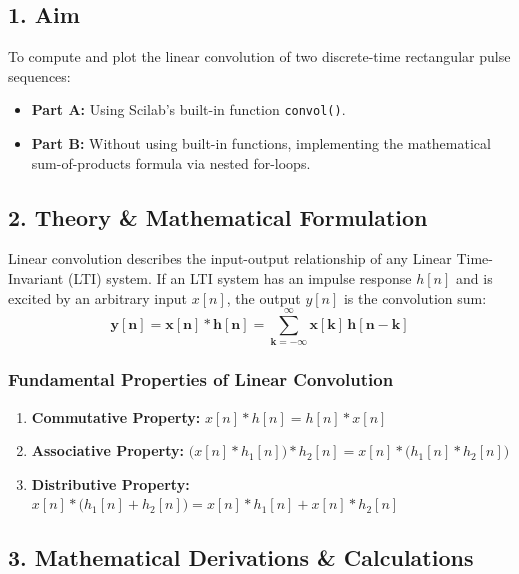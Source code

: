 \documentclass[11pt,a4paper]{article}
\begin{document}
\subsection*{1. Aim}
To compute and plot the linear convolution of two discrete-time rectangular pulse sequences:
\begin{itemize}
    \item \textbf{Part A:} Using Scilab's built-in function \texttt{convol()}.
    \item \textbf{Part B:} Without using built-in functions, implementing the mathematical sum-of-products formula via nested for-loops.
\end{itemize}

\subsection*{2. Theory \& Mathematical Formulation}

Linear convolution describes the input-output relationship of any Linear Time-Invariant (LTI) system. If an LTI system has an impulse response $h[n]$ and is excited by an arbitrary input $x[n]$, the output $y[n]$ is the convolution sum:
\begin{equation}
    \mathbf{y[n] = x[n] * h[n] = \sum_{k=-\infty}^{\infty} x[k] \, h[n - k]}
\end{equation}

\subsubsection*{Fundamental Properties of Linear Convolution}
\begin{enumerate}
    \item \textbf{Commutative Property:} $x[n] * h[n] = h[n] * x[n]$
    \item \textbf{Associative Property:} $\big(x[n] * h_1[n]\big) * h_2[n] = x[n] * \big(h_1[n] * h_2[n]\big)$
    \item \textbf{Distributive Property:} $x[n] * \big(h_1[n] + h_2[n]\big) = x[n] * h_1[n] + x[n] * h_2[n]$
\end{enumerate}

\subsection*{3. Mathematical Derivations \& Calculations}
\end{document}

